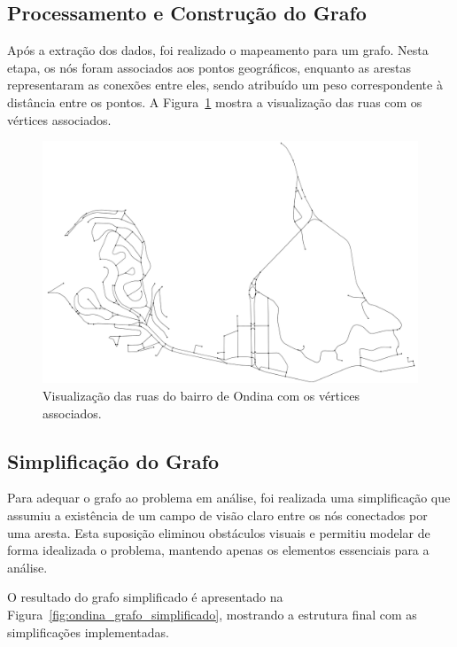 \documentclass[12pt, a4paper]{report}
\begin{document}
\subsection{Processamento e Construção do Grafo}

Após a extração dos dados, foi realizado o mapeamento para um grafo. Nesta etapa, os nós foram associados aos pontos geográficos, enquanto as arestas representaram as conexões entre eles, sendo atribuído um peso correspondente à distância entre os pontos. A Figura~\ref{fig:ondina_grafo_bruto} mostra a visualização das ruas com os vértices associados.

\begin{figure}[H]
    \centering
    \includegraphics[width=\textwidth]{ondina_grafo_bruto}
    \caption{Visualização das ruas do bairro de Ondina com os vértices associados.}
    \label{fig:ondina_grafo_bruto}
\end{figure}

\subsection{Simplificação do Grafo}

Para adequar o grafo ao problema em análise, foi realizada uma simplificação que assumiu a existência de um campo de visão claro entre os nós conectados por uma aresta. Esta suposição eliminou obstáculos visuais e permitiu modelar de forma idealizada o problema, mantendo apenas os elementos essenciais para a análise.

O resultado do grafo simplificado é apresentado na Figura~\ref{fig:ondina_grafo_simplificado}, mostrando a estrutura final com as simplificações implementadas.
\end{document}

